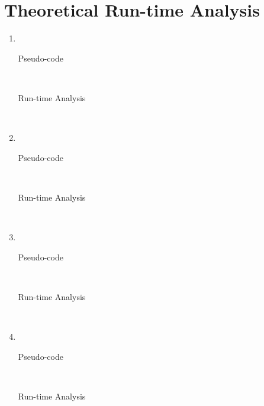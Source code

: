 \documentclass[paper=a4, fontsize=11pt]{scrartcl} %
\title{ 
    \normalfont \normalsize 
    \textsc{Oregon State University} \\ [25pt]
    \large Project Group #21
    \horrule{0.5pt} \\[0.4cm] %
    \huge \hwtitle \\ %
    \horrule{2pt} \\[0.5cm] %
}
\author{
    Colin Bradford
    \and
    Charles Jenkins
    \and
    Albert Le
} %
\date{\normalsize\today} %
\numberwithin{equation}{section} %
\numberwithin{figure}{section} %
\numberwithin{table}{section} %
\begin{document}
\maketitle %


\section{Theoretical Run-time Analysis}
\begin{enumerate}[label=\bfseries Algorithm \arabic*:]
    \item \hfill \\
    \begin{description}
        \item[Pseudo-code] \hfill \\
        \item[Run-time Analysis] \hfill \\
    \end{description}

    \item \hfill \\
    \begin{description}
        \item[Pseudo-code] \hfill \\
        \item[Run-time Analysis] \hfill \\
    \end{description}

    \item \hfill \\
    \begin{description}
        \item[Pseudo-code] \hfill \\
        \item[Run-time Analysis] \hfill \\
    \end{description}

    \item \hfill \\
    \begin{description}
        \item[Pseudo-code] \hfill \\
        \item[Run-time Analysis] \hfill \\
    \end{description}
\end{enumerate}
\end{document}
